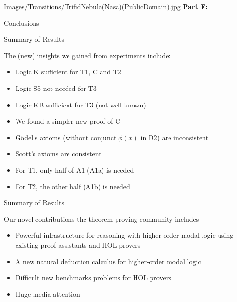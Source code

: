 
\begin{transitionframe}{Images/Transitions/TrifidNebula(Nasa)(PublicDomain).jpg}
\textbf{Part F:}

Conclusions
\end{transitionframe}



\begin{frame}{Summary of Results} \large

The (\alert{new}) insights we gained from experiments include:\\[.5em]
\begin{itemize}
\item Logic K sufficient for T1, C and T2 
\item Logic S5 not needed for T3
\item \alert{Logic KB sufficient for T3 (not well known)}
\item \alert{We found a simpler new proof of C}
\item \alert{G\"odel's axioms (without conjunct $\phi(x)$ in D2) are inconsistent}
\item Scott's axioms are consistent
\item For T1, only half of A1 (A1a) is needed 
\item For T2, the other half (A1b) is needed
\end{itemize}
\end{frame}


\begin{frame}{Summary of Results} \large

Our novel contributions the  theorem proving community includes \\[.5em]
\begin{itemize}
\item Powerful infrastructure for reasoning with higher-order modal logic using existing proof assistants and HOL provers
\item A new natural deduction calculus for higher-order modal logic
\item Difficult new benchmarks problems for HOL provers
\item Huge media attention
\end{itemize}
\end{frame}

